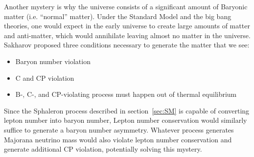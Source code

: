\documentclass[/main.tex]{subfiles}
\begin{document}
Another mystery is why the universe consists of a significant amount of Baryonic matter (i.e. ``normal'' matter).
Under the Standard Model and the big bang theories, one would expect in the early universe to create large amounts of matter and anti-matter, which would annihilate leaving almost no matter in the universe.
Sakharov proposed three conditions necessary to generate the matter that we see\cite{Sakharov1967}:
\begin{itemize}
\item Baryon number violation
\item C and CP violation
\item B-, C-, and CP-violating process must happen out of thermal equilibrium
\end{itemize}
Since the Sphaleron process described in section~\ref{sec:SM} is capable of converting lepton number into baryon number, Lepton number conservation would similarly suffice to generate a baryon number asymmetry.
Whatever process generates Majorana neutrino mass would also violate lepton number conservation and generate additional CP violation, potentially solving this mystery.
\end{document}
